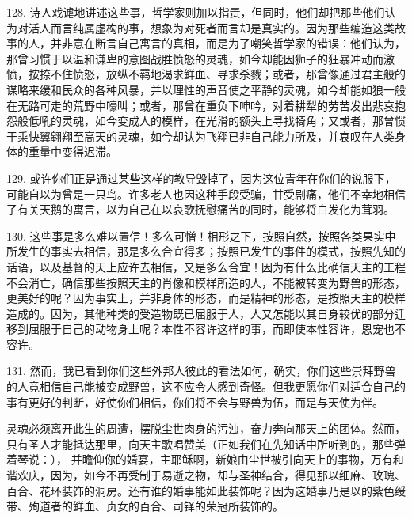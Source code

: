 128. 诗人戏谑地讲述这些事，哲学家则加以指责，但同时，他们却把那些他们认为对活人而言纯属虚构的事，想象为对死者而言却是真实的。因为那些编造这类故事的人，并非意在断言自己寓言的真相，而是为了嘲笑哲学家的错误：他们认为，那曾习惯于以温和谦卑的意图战胜愤怒的灵魂，如今却能因狮子的狂暴冲动而激愤，按捺不住愤怒，放纵不羁地渴求鲜血、寻求杀戮；或者，那曾像通过君主般的谋略来缓和民众的各种风暴，并以理性的声音使之平静的灵魂，如今却能如狼一般在无路可走的荒野中嚎叫；或者，那曾在重负下呻吟，对着耕犁的劳苦发出悲哀抱怨般低吼的灵魂，如今变成人的模样，在光滑的额头上寻找犄角；又或者，那曾惯于乘快翼翱翔至高天的灵魂，如今却认为飞翔已非自己能力所及，并哀叹在人类身体的重量中变得迟滞。\par

129. 或许你们正是通过某些这样的教导毁掉了，因为这位青年在你们的说服下，可能自以为曾是一只鸟。许多老人也因这种手段受骗，甘受剧痛，他们不幸地相信了有关天鹅的寓言，以为自己在以哀歌抚慰痛苦的同时，能够将白发化为茸羽。\par

130. 这些事是多么难以置信！多么可憎！相形之下，按照自然，按照各类果实中所发生的事实去相信，那是多么合宜得多；按照已发生的事件的模式，按照先知的话语，以及基督的天上应许去相信，又是多么合宜！因为有什么比确信天主的工程不会消亡，确信那些按照天主的肖像和模样所造的人，不能被转变为野兽的形态，更美好的呢？因为事实上，并非身体的形态，而是精神的形态，是按照天主的模样造成的。因为，其他种类的受造物既已屈服于人，人又怎能以其自身较优的部分迁移到屈服于自己的动物身上呢？本性不容许这样的事，而即使本性容许，恩宠也不容许。\par

131. 然而，我已看到你们这些外邦人彼此的看法如何，确实，你们这些崇拜野兽的人竟相信自己能被变成野兽，这不应令人感到奇怪。但我更愿你们对适合自己的事有更好的判断，好使你们相信，你们将不会与野兽为伍，而是与天使为伴。\par

灵魂必须离开此生的周遭，摆脱尘世肉身的污浊，奋力奔向那天上的团体。然而，只有圣人才能抵达那里，向天主歌唱赞美（正如我们在先知话中所听到的，那些弹着琴说：）， 并瞻仰你的婚宴，主耶稣啊，新娘由尘世被引向天上的事物，万有和谐欢庆，因为，如今不再受制于易逝之物，却与圣神结合，得见那以细麻、玫瑰、百合、花环装饰的洞房。还有谁的婚事能如此装饰呢？因为这婚事乃是以的紫色绶带、殉道者的鲜血、贞女的百合、司铎的荣冠所装饰的。\par

